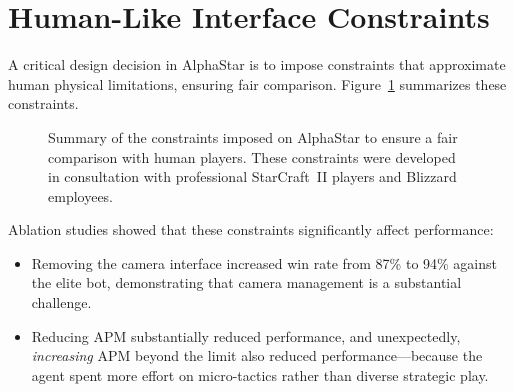 \documentclass[11pt,a4paper]{article}
\begin{document}
\section{Human-Like Interface Constraints}

A critical design decision in AlphaStar is to impose constraints that approximate human physical limitations, ensuring fair comparison. Figure~\ref{fig:constraints} summarizes these constraints.

\begin{figure}[H]
\centering
{}
\caption{Summary of the constraints imposed on AlphaStar to ensure a fair comparison with human players. These constraints were developed in consultation with professional StarCraft~II players and Blizzard employees.}
\label{fig:constraints}
\end{figure}

Ablation studies showed that these constraints significantly affect performance:
\begin{itemize}[nosep]
    \item Removing the camera interface increased win rate from 87\% to 94\% against the elite bot, demonstrating that camera management is a substantial challenge.
    \item Reducing APM substantially reduced performance, and unexpectedly, \emph{increasing} APM beyond the limit also reduced performance---because the agent spent more effort on micro-tactics rather than diverse strategic play.
\end{itemize}
\end{document}
